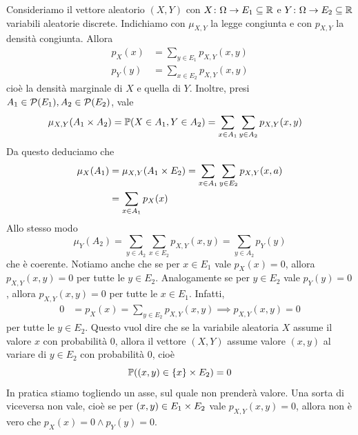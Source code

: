 \documentclass[a4paper]{article}
\begin{document}
\begin{snippetexample}{}
    Consideriamo il vettore aleatorio
    \((X,Y)\)
    con \(X \colon \Omega \to E_1 \subseteq \mathbb{R}\)
    e \(Y \colon \Omega \to E_2 \subseteq \mathbb{R}\)
    variabili aleatorie discrete.
    Indichiamo con \(\mu_{X,Y}\) la legge congiunta e con \(p_{X,Y}\)
    la densità congiunta. Allora
    \begin{align*}
        p_X(x) &= \sum_{y\in E_1} p_{X,Y}(x,y) \\
        p_Y(y) &= \sum_{x\in E_2} p_{X,Y}(x,y)
    \end{align*}
    cioè la densità marginale di \(X\) e quella di \(Y\).
    Inoltre, presi \(A_1 \in \mathcal P(E_1), A_2 \in \mathcal P(E_2)\),
    vale
    \begin{align*}
        \mu_{X,Y}(A_1 \times A_2)
        &= \mathbb P(X \in A_1, Y \in A_2)
        = \sum_{x \in A_1}
        \sum_{y \in A_2} p_{X,Y}(x,y)
    \end{align*}
    Da questo deduciamo che
    \begin{align*}
        \mu_X(A_1) &= \mu_{X,Y}(A_1 \times E_2)
        = \sum_{x \in A_1}
        \sum_{y \in E_2}
        p_{X,Y}(x,a) \\
        &= \sum_{x \in A_1} p_{X}(x)
    \end{align*}
    Allo stesso modo
    \[
        \mu_Y(A_2) = \sum_{y \in A_2} \sum_{x \in E_2} p_{X,Y}(x,y)
        = \sum_{y \in A_2} p_Y(y)
    \]
    che è coerente.
    Notiamo anche che se per \(x \in E_1\) vale \(p_X(x) = 0\),
    allora \(p_{X,Y}(x,y) = 0\) per tutte le \(y \in E_2\).
    Analogamente se per \(y \in E_2\) vale \(p_Y(y) = 0\),
    allora \(p_{X,Y}(x,y) = 0\) per tutte le \(x \in E_1\).
    Infatti,
    \begin{align*}
        0 &= p_X(x) = \sum_{y\in E_2} p_{X,Y}(x,y)
        \implies p_{X,Y}(x,y) = 0
    \end{align*}
    per tutte le \(y \in E_2\).
    Questo vuol dire che se la variabile aleatoria \(X\)
    assume il valore \(x\) con probabilità \(0\),
    allora il vettore \((X,Y)\) assume
    valore \((x,y)\) al variare di \(y \in E_2\) con
    probabilità \(0\), cioè
    \[
        \mathbb P((x,y) \in \{x\} \times E_2) = 0
    \]
    In pratica stiamo togliendo un asse, sul quale non prenderà valore.
    Una sorta di viceversa non vale, cioè se per \((x,y) \in E_1 \times E_2\)
    vale \(p_{X,Y}(x,y) = 0\), allora non è vero che
    \(p_X(x) = 0 \land p_Y(y) = 0\).
\end{snippetexample}
\end{document}
